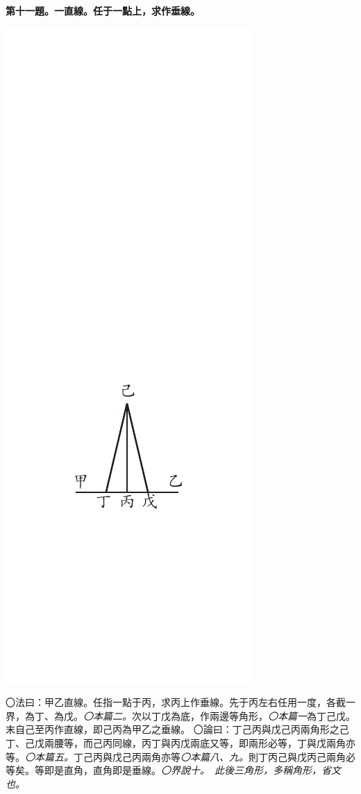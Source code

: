 \documentclass[12pt,b5paper,landscape]{article}
\newcommand{\ccom}[1]{{\footnotesize \emph{〇#1}}}
\newcommand{\bcom}[1]{〇#1}
\newcommand{\cthm}[1]{{
\vspace{8pt}

\bfseries #1}}
\begin{document}
\begin{multicols}{2}
\cthm{第十一題。一直線。任于一點上，求作垂線。}
\begin{center}
\includegraphics[angle=90]{eu50}
\end{center}
\bcom{法曰：甲乙直線。任指一點于丙，求丙上作垂線。先于丙左右任用一度，各截一界，為丁、為戊。\ccom{本篇二。}次以丁戊為底，作兩邊等角形，\ccom{本篇一}為丁己戊。末自己至丙作直線，即己丙為甲乙之垂線。}
\bcom{論曰：丁己丙與戊己丙兩角形之己丁、己戊兩腰等，而己丙同線，丙丁與丙戊兩底又等，即兩形必等，丁與戊兩角亦等。\ccom{本篇五。}丁己丙與戊己丙兩角亦等\ccom{本篇八、九。}則丁丙己與戊丙己兩角必等矣。等即是直角，直角即是垂線。\ccom{界說十。　此後三角形，多稱角形，省文也。}}

\end{multicols}
\end{document}
